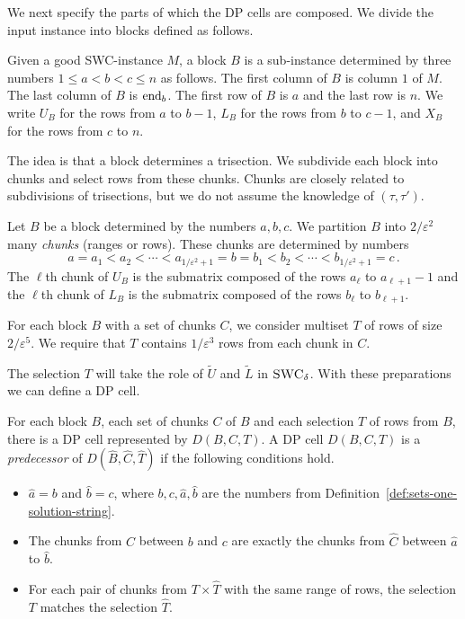 We next specify the parts of which the DP cells are composed.
We divide the input instance into blocks defined as follows.
\begin{definition}[Block]
    Given a good SWC-instance $M$, a block $B$ is a sub-instance determined by three numbers $1 \le a < b < c \le n$ as follows.
    The first column of $B$ is column $1$ of $M$. 
    The last column of $B$ is $\textrm{end}_{b}$.
    The first row of $B$ is $a$ and the last row is $n$.
    We write $U_B$ for the rows from $a$ to $b - 1$, $L_B$ for the rows from $b$ to $c - 1$, and $X_B$ for the rows from $c$ to $n$. 
    \label{def:sets-one-solution-string}
\end{definition}
The idea is that a block determines a trisection. 
We subdivide each block into chunks and select rows from these chunks. 
Chunks are closely related to subdivisions of trisections, but we do not assume the knowledge of $(\tau,\tau')$.
\begin{definition}[Chunk] 
    Let $B$ be a block determined by the numbers $a,b,c$.
    We partition $B$ into $2/\varepsilon^2$ many \emph{chunks} (ranges or rows).
    These chunks are determined by numbers 
    \[
    a = a_1 < a_{2} < \dotsm < a_{1/\varepsilon^2 + 1} = b = b_{1} < b_{2} < \dotsm < b_{1/\varepsilon^2 + 1} = c\,.
    \]
    The $\ell$th chunk of $U_B$ is the submatrix composed of the rows $a_{\ell}$ to $a_{\ell+1}-1$ and the $\ell$th chunk of $L_B$ is the submatrix composed of the rows $b_{\ell}$ to $b_{\ell+1}$.
    \label{def:subsets-one-solution-string}
\end{definition}

\begin{definition}[Selection]
    \label{def:selection}
    For each block $B$ with a set of chunks $C$, we consider multiset $T$ of rows of size $2/\varepsilon^5$.
    We require that $T$ contains $1/\varepsilon^3$ rows from each chunk in $C$.
\end{definition}
The selection $T$ will take the role of $\tilde{U}$ and $\tilde{L}$ in $\textsc{SWC}_\delta$.
With these preparations we can define a DP cell.
\begin{definition}[DP cell]
    For each block $B$, each set of chunks $C$ of $B$ and each selection $T$ of rows from $B$, there is a DP cell represented by $D(B,C,T)$. 
    A DP cell $D(B,C,T)$ is a \emph{predecessor} of $D(\hat B,\hat C,\hat T)$ if the following conditions hold.
    \begin{itemize}
        \item $\hat{a} = b$ and $\hat{b} = c$, where $b,c,\hat{a},\hat{b}$ are the numbers from Definition~\ref{def:sets-one-solution-string}.
        \item The chunks from $C$ between $b$ and $c$ are exactly the chunks from $\hat{C}$ between $\hat{a}$ to $\hat{b}$.
        \item For each pair of chunks from $T \times \hat{T}$ with the same range of rows, the selection $T$ matches the selection $\hat{T}$. 
            \label{def:dp-cell-one-solution-string}
    \end{itemize}
\end{definition} 

